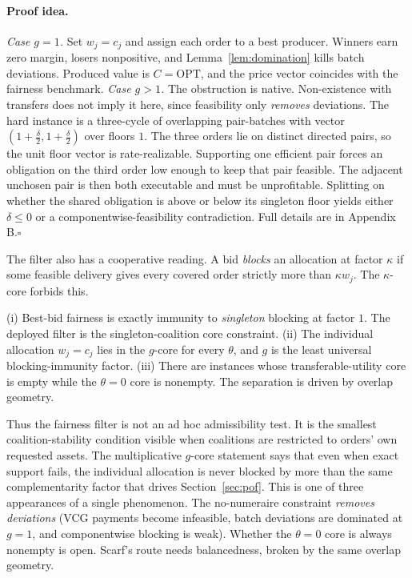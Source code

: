 \documentclass{llncs}
\newcommand{\OPT}{\mathrm{OPT}}
\begin{document}
\paragraph{Proof idea.}
\emph{Case $g=1$.} Set $w_j=c_j$ and assign each order to a best producer.
Winners earn zero margin, losers nonpositive, and
Lemma~\ref{lem:domination} kills batch deviations. Produced value is
$C=\OPT$, and the price vector coincides with the fairness benchmark.
\emph{Case $g>1$.} The obstruction is native. Non-existence with transfers
does not imply it here, since feasibility only \emph{removes}
deviations. The hard instance is a three-cycle of overlapping
pair-batches with vector $(1+\tfrac\delta2,1+\tfrac\delta2)$ over floors
$1$. The three orders lie on distinct directed pairs, so the unit floor
vector is rate-realizable. Supporting one efficient pair forces an
obligation on the third order low enough to keep that pair feasible. The
adjacent unchosen pair is
then both executable and must be unprofitable. Splitting on whether the
shared obligation is above or below its singleton floor yields either
$\delta\le0$ or a componentwise-feasibility contradiction. Full details are
in Appendix B.\hfill$\square$

The filter also has a cooperative reading. A bid \emph{blocks} an
allocation at factor $\kappa$ if some feasible delivery gives every
covered order strictly more than $\kappa w_j$. The $\kappa$-core forbids
this.

\begin{proposition}\label{prop:core}
(i) Best-bid fairness is exactly immunity to \emph{singleton} blocking at
factor $1$. The deployed filter is the singleton-coalition core
constraint. (ii) The individual allocation $w_j=c_j$ lies in the
$g$-core for every $\theta$, and $g$ is the least universal
blocking-immunity factor. (iii) There are instances whose
transferable-utility core is empty while the $\theta=0$ core is
nonempty. The separation is driven by overlap geometry.
\end{proposition}

Thus the fairness filter is not an ad hoc admissibility test. It is the
smallest coalition-stability condition visible when coalitions are
restricted to orders' own requested assets. The multiplicative $g$-core
statement says that even when exact support fails, the individual
allocation is never blocked by more than the same complementarity factor
that drives Section~\ref{sec:pof}. This is one of three appearances of a single
phenomenon. The no-numeraire constraint \emph{removes deviations} (VCG
payments become infeasible, batch deviations are dominated at $g=1$, and
componentwise blocking is weak). Whether the $\theta=0$ core is always
nonempty is open. Scarf's route needs balancedness, broken by the same
overlap geometry.
\end{document}
